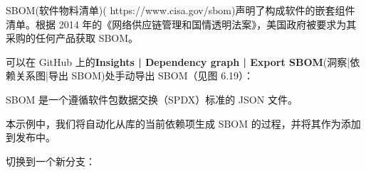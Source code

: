 
SBOM(软件物料清单)( https://www.cisa.gov/sbom)声明了构成软件的嵌套组件清单。根据 2014 年的《网络供应链管理和国情透明法案》，美国政府被要求为其采购的任何产品获取 SBOM。

可以在 GitHub 上的\textbf{Insights | Dependency graph | Export SBOM}(洞察|依赖关系图|导出 SBOM)处手动导出 SBOM（见图 6.19）：


SBOM 是一个遵循软件包数据交换（SPDX）标准的 JSON 文件。

本示例中，我们将自动化从库的当前依赖项生成 SBOM 的过程，并将其作为添加到发布中。


切换到一个新分支：



